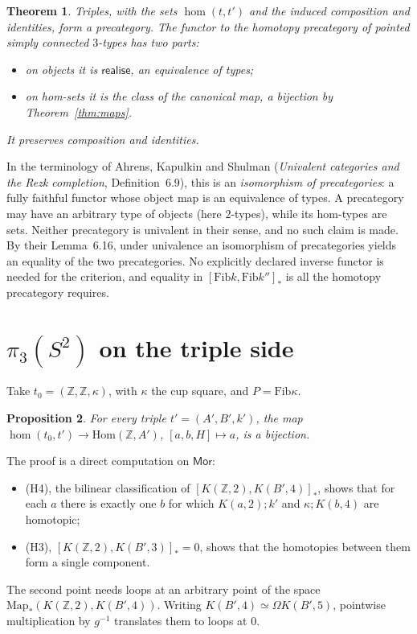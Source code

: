 \documentclass[11pt]{amsart}
\newtheorem{theorem}{Theorem}
\newtheorem{proposition}[theorem]{Proposition}
\theoremstyle{remark}
\newcommand{\Om}{\Omega}
\newcommand{\Fib}{\mathrm{Fib}}
\newcommand{\Map}{\mathrm{Map}_*}
\newcommand{\Mor}{\mathsf{Mor}}
\newcommand{\Hom}{\mathrm{Hom}}
\newcommand{\Z}{\mathbb{Z}}
\newcommand{\cmp}{\mathbin{;}}
\newcommand{\real}{\mathsf{realise}}
\begin{document}
\begin{theorem}\label{thm:hocat}
Triples, with the sets $\hom(t,t')$ and the induced composition and identities,
form a precategory. The functor to the homotopy precategory of pointed simply
connected $3$-types has two parts:
\begin{itemize}
\item on objects it is $\real$, an equivalence of types;
\item on hom-sets it is the class of the canonical map, a bijection by
Theorem~\ref{thm:maps}.
\end{itemize}
It preserves composition and identities.
\end{theorem}

In the terminology of Ahrens, Kapulkin and Shulman
(\emph{Univalent categories and the Rezk completion}, Definition~6.9), this is
an \emph{isomorphism of precategories}: a fully faithful functor whose object map
is an equivalence of types. A precategory may have an arbitrary type of objects
(here $2$-types), while its hom-types are sets. Neither precategory is univalent
in their sense, and no such claim is made. By their Lemma~6.16, under univalence
an isomorphism of precategories yields an equality of the two precategories.
No explicitly declared inverse functor is needed for the criterion, and
equality in $[\Fib k,\Fib k'']_*$ is all the homotopy precategory requires.

\section{$\pi_3(S^2)$ on the triple side}\label{sec:pi3}

Take $t_0=(\Z,\Z,\kappa)$, with $\kappa$ the cup square, and $P=\Fib\kappa$.

\begin{proposition}
For every triple $t'=(A',B',k')$, the map $\hom(t_0,t')\to\Hom(\Z,A')$,
$[a,b,H]\mapsto a$, is a bijection.
\end{proposition}

The proof is a direct computation on $\Mor$:
\begin{itemize}
\item (H4), the bilinear classification of $[K(\Z,2),K(B',4)]_*$, shows that
for each $a$ there is exactly one $b$ for which $K(a,2)\cmp k'$ and
$\kappa\cmp K(b,4)$ are homotopic;
\item (H3), $[K(\Z,2),K(B',3)]_*=0$, shows that the homotopies between them form
a single component.
\end{itemize}
The second point needs loops at an arbitrary point of the space
$\Map(K(\Z,2),K(B',4))$. Writing $K(B',4)\simeq\Om K(B',5)$, pointwise
multiplication by $g^{-1}$ translates them to loops at $0$.
\end{document}
